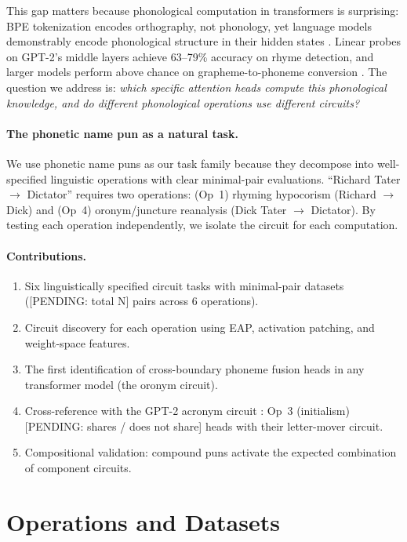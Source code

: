 \documentclass{article}
\newcommand{\PENDING}[1]{{\color{blue}[PENDING: #1]}}
\begin{document}
This gap matters because phonological computation in transformers is
surprising: BPE tokenization encodes orthography, not phonology, yet language
models demonstrably encode phonological structure in their hidden states
\citep{liao2026tokenization}. Linear probes on GPT-2's middle layers achieve
63--79\% accuracy on rhyme detection, and larger models perform above chance
on grapheme-to-phoneme conversion \citep{suvarna2024phonologybench}. The
question we address is: \emph{which specific attention heads compute this
phonological knowledge, and do different phonological operations use different
circuits?}

\paragraph{The phonetic name pun as a natural task.}
We use phonetic name puns as our task family because they decompose into
well-specified linguistic operations with clear minimal-pair evaluations.
``Richard Tater $\to$ Dictator'' requires two operations: (Op~1) rhyming
hypocorism (Richard $\to$ Dick) and (Op~4) oronym/juncture reanalysis
(Dick Tater $\to$ Dictator). By testing each operation independently, we
isolate the circuit for each computation.

\paragraph{Contributions.}
\begin{enumerate}[leftmargin=*,itemsep=2pt]
  \item Six linguistically specified circuit tasks with minimal-pair datasets
  (\PENDING{total N} pairs across 6 operations).
  \item Circuit discovery for each operation using EAP, activation patching,
  and weight-space features.
  \item The first identification of cross-boundary phoneme fusion heads in
  any transformer model (the oronym circuit).
  \item Cross-reference with the GPT-2 acronym circuit
  \citep{garcia2024acronym}: Op~3 (initialism) \PENDING{shares / does not
  share} heads with their letter-mover circuit.
  \item Compositional validation: compound puns activate the expected
  combination of component circuits.
\end{enumerate}

\section{Operations and Datasets}
\end{document}
